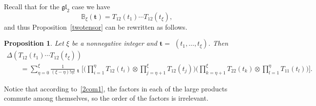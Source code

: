 \documentclass[10pt,a4paper]{amsart}
\numberwithin{equation}{section}
\newtheorem{Proposition}[Theorem]{Proposition}
 { \theoremstyle{definition}
\newtheorem{Definition}[Theorem]{Definition}
\newtheorem*{Example}{Example}
\newtheorem*{Remark}{Remark} }
\DeclareMathOperator{\Symb}{\overline{Sym} }
\begin{document}
Recall that for the $\mathfrak{gl}_2$ case we have
\begin{equation*}
{\mathbb{B}}_\xi(\boldsymbol{t})=T_{12} (t_{1} ) \cdots T_{12} (t_{\xi} ),
\end{equation*}
and thus Proposition~\ref{twotensor} can be rewritten as follows.
\begin{Proposition} \label{twotensorsA}
Let $\xi$ be a nonnegative integer and $\boldsymbol{t}=$ $(t_{1}, \dots, t_{\xi} )$. Then
\begin{gather}
\Delta ( T_{12} (t_{1} ) \cdots T_{12} (t_{\xi} ) )
\label{cop2}\\
\qquad{}=\sum_{\eta=0}^{\xi} \frac{1}{(\xi-\eta) ! \eta!} \Symb_{\boldsymbol{t}}\Biggl[ \Biggl(\prod_{i=1}^{\eta} T_{12} (t_i) \otimes \prod_{j=\eta+1}^{\xi } T_{12} (t_j) \Biggr)
\Biggl(\prod_{k=\eta+1}^{\xi } T _{22}(t_{k})\otimes \prod_{l=1}^{\eta} T _{11}(t_l)\Biggr) \Biggr].\nonumber
\end{gather}

\end{Proposition}
\begin{Remark}
Notice that according to~\eqref{2com1}, the factors in each of the large products commute among themselves, so the order of the factors is irrelevant.
\end{Remark}
\end{document}
